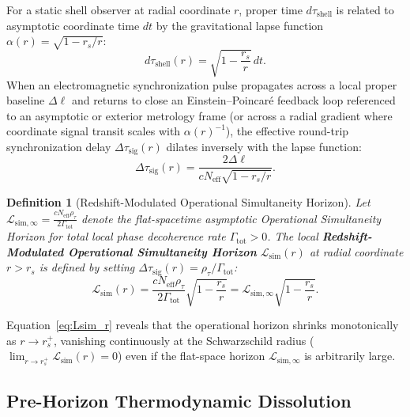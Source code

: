 \documentclass[11pt,a4paper]{article}
\newtheorem{definition}{Definition}
\begin{document}
For a static shell observer at radial coordinate $r$, proper time $d\tau_{\mathrm{shell}}$ is related to asymptotic coordinate time $dt$ by the gravitational lapse function $\alpha(r) = \sqrt{1 - r_s/r}$:
\begin{equation}
d\tau_{\mathrm{shell}}(r) = \sqrt{1 - \frac{r_s}{r}}\, dt.
\end{equation}
When an electromagnetic synchronization pulse propagates across a local proper baseline $\Delta\ell$ and returns to close an Einstein--Poincaré feedback loop referenced to an asymptotic or exterior metrology frame (or across a radial gradient where coordinate signal transit scales with $\alpha(r)^{-1}$), the effective round-trip synchronization delay $\Delta\tau_{\mathrm{sig}}(r)$ dilates inversely with the lapse function:
\begin{equation}
\Delta\tau_{\mathrm{sig}}(r) = \frac{2 \Delta\ell}{c N_{\mathrm{eff}} \sqrt{1 - r_s/r}}.
\end{equation}

\begin{definition}[Redshift-Modulated Operational Simultaneity Horizon]
Let $\mathcal{L}_{\mathrm{sim},\infty} = \frac{c N_{\mathrm{eff}} \rho_\tau}{2 \Gamma_{\mathrm{tot}}}$ denote the flat-spacetime asymptotic Operational Simultaneity Horizon for total local phase decoherence rate $\Gamma_{\mathrm{tot}} > 0$. The local \textbf{Redshift-Modulated Operational Simultaneity Horizon} $\mathcal{L}_{\mathrm{sim}}(r)$ at radial coordinate $r > r_s$ is defined by setting $\Delta\tau_{\mathrm{sig}}(r) = \rho_\tau / \Gamma_{\mathrm{tot}}$:
\begin{equation}
\mathcal{L}_{\mathrm{sim}}(r) = \frac{c N_{\mathrm{eff}} \rho_\tau}{2 \Gamma_{\mathrm{tot}}} \sqrt{1 - \frac{r_s}{r}} = \mathcal{L}_{\mathrm{sim},\infty} \sqrt{1 - \frac{r_s}{r}}.
\label{eq:Lsim_r}
\end{equation}
\end{definition}

Equation~\eqref{eq:Lsim_r} reveals that the operational horizon shrinks monotonically as $r \to r_s^+$, vanishing continuously at the Schwarzschild radius ($\lim_{r \to r_s^+} \mathcal{L}_{\mathrm{sim}}(r) = 0$) even if the flat-space horizon $\mathcal{L}_{\mathrm{sim},\infty}$ is arbitrarily large.

\subsection{Pre-Horizon Thermodynamic Dissolution}
\end{document}
